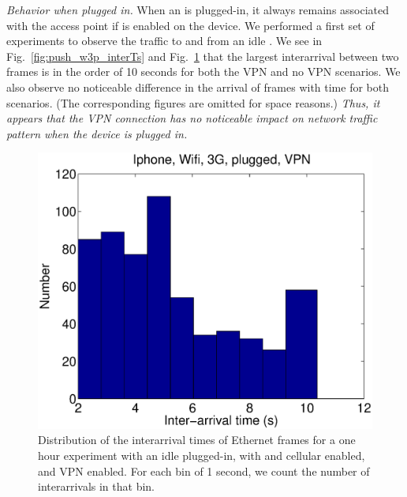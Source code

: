 \noindent\emph{Behavior when plugged in.} When an \iphone{} is plugged-in, it always remains associated with the
\wifi{} access point if \wifi{} is enabled on the device. We performed
a first set of experiments to observe the traffic to and from an idle
\iphone{}. We see in Fig.~\ref{fig:push_w3p_interTs} and
Fig.~\ref{fig:push_w3pv_interTs} that the largest interarrival between
two frames is in the order of 10 seconds for both the VPN and no VPN
scenarios. We also observe no noticeable difference in the arrival of
frames with time for both scenarios. (The corresponding figures are 
omitted for space reasons.)
\emph{Thus, it appears that the VPN connection has no noticeable
  impact on network traffic pattern when the device is plugged in.}


\begin{figure}[htb]
\centering
        \includegraphics[width=0.8\linewidth]{../../code/pushNotification/Fig/bw_iphone_wifi_3g_plug_vpn_interTs.eps}
  \caption{Distribution of the interarrival times of Ethernet frames
    for a one hour experiment with an idle \iphone{} plugged-in, with \wifi{} and cellular
    enabled, and VPN enabled. For each bin of 1 second, we count
    the number of interarrivals in that bin.}
  \label{fig:push_w3pv_interTs}
   \vspace{\postfigspace}
\end{figure}



